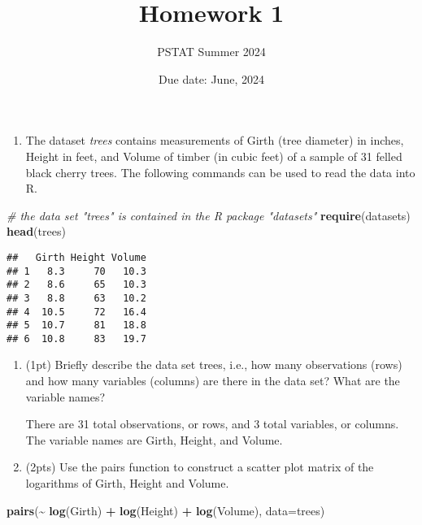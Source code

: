 \documentclass[
]{article}
\title{Homework 1}
\subtitle{PSTAT Summer 2024}
\author{}
\date{\vspace{-2.5em}Due date: June, 2024}
\newenvironment{Shaded}{\begin{snugshade}}{\end{snugshade}}
\newcommand{\AttributeTok}[1]{\textcolor[rgb]{0.13,0.29,0.53}{#1}}
\newcommand{\CommentTok}[1]{\textcolor[rgb]{0.56,0.35,0.01}{\textit{#1}}}
\newcommand{\FunctionTok}[1]{\textcolor[rgb]{0.13,0.29,0.53}{\textbf{#1}}}
\newcommand{\NormalTok}[1]{#1}
\newcommand{\SpecialCharTok}[1]{\textcolor[rgb]{0.81,0.36,0.00}{\textbf{#1}}}
\providecommand{\tightlist}{%
  \setlength{\itemsep}{0pt}\setlength{\parskip}{0pt}}
\begin{document}
\maketitle

\begin{enumerate}
\def\labelenumi{\arabic{enumi}.}
\tightlist
\item
  The dataset \emph{trees} contains measurements of Girth (tree
  diameter) in inches, Height in feet, and Volume of timber (in cubic
  feet) of a sample of 31 felled black cherry trees. The following
  commands can be used to read the data into R.
\end{enumerate}

\begin{Shaded}
\begin{Highlighting}[]
\CommentTok{\# the data set "trees" is contained in the R package "datasets"}
\FunctionTok{require}\NormalTok{(datasets)}
\FunctionTok{head}\NormalTok{(trees)}
\end{Highlighting}
\end{Shaded}

\begin{verbatim}
##   Girth Height Volume
## 1   8.3     70   10.3
## 2   8.6     65   10.3
## 3   8.8     63   10.2
## 4  10.5     72   16.4
## 5  10.7     81   18.8
## 6  10.8     83   19.7
\end{verbatim}

\begin{enumerate}
\def\labelenumi{(\alph{enumi})}
\item
  (1pt) Briefly describe the data set trees, i.e., how many observations
  (rows) and how many variables (columns) are there in the data set?
  What are the variable names?

  There are 31 total observations, or rows, and 3 total variables, or
  columns. The variable names are Girth, Height, and Volume.
\item
  (2pts) Use the pairs function to construct a scatter plot matrix of
  the logarithms of Girth, Height and Volume.
\end{enumerate}

\begin{Shaded}
\begin{Highlighting}[]
\FunctionTok{pairs}\NormalTok{(}\SpecialCharTok{\textasciitilde{}} \FunctionTok{log}\NormalTok{(Girth) }\SpecialCharTok{+} \FunctionTok{log}\NormalTok{(Height) }\SpecialCharTok{+} \FunctionTok{log}\NormalTok{(Volume), }\AttributeTok{data=}\NormalTok{trees)}
\end{Highlighting}
\end{Shaded}
\end{document}
